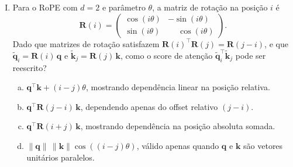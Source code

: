 \documentclass{dlproblemset}
\begin{document}
\begin{enumerate}[I)]
\begin{enumerate}[a)]
    \item São algebraicamente equivalentes: rotacionar os vetores de query e key com
          RoPE produz exatamente o mesmo logit de atenção que somar o PE senoidal ao
          embedding de entrada.
    \item São equivalentes quando $\mathbf{W}_Q = \mathbf{W}_K = \mathbf{I}$ (projeções identidade),
          pois nesse caso adição e rotação têm o mesmo efeito sobre o produto interno.
    \item O PE senoidal é um caso especial do RoPE aplicado somente às duas
          primeiras dimensões do embedding de entrada.
    \item Compartilham o mesmo espectro, mas o PE senoidal soma posição
          \emph{absoluta} antes das projeções e o RoPE aplica rotação
          \emph{relativa} depois delas; nenhuma configuração não trivial de
          pesos os torna equivalentes.
\end{enumerate}

\item {} Para o RoPE com $d = 2$ e parâmetro $\theta$,
      a matriz de rotação na posição $i$ é
      \[
        \mathbf{R}(i) =
        \begin{pmatrix}
          \cos(i\theta) & -\sin(i\theta) \\
          \sin(i\theta) & \phantom{-}\cos(i\theta)
        \end{pmatrix}.
      \]
      Dado que matrizes de rotação satisfazem $\mathbf{R}(i)^\top \mathbf{R}(j) = \mathbf{R}(j - i)$,
      e que $\tilde{\mathbf{q}}_i = \mathbf{R}(i)\,\mathbf{q}$ e
      $\tilde{\mathbf{k}}_j = \mathbf{R}(j)\,\mathbf{k}$, como o score de atenção
      $\tilde{\mathbf{q}}_i^\top \tilde{\mathbf{k}}_j$ pode ser reescrito?

\begin{enumerate}[a)]
    \item $\mathbf{q}^\top\mathbf{k} + (i-j)\theta$,
          mostrando dependência linear na posição relativa.
    \item $\mathbf{q}^\top \mathbf{R}(j-i)\,\mathbf{k}$, dependendo apenas do offset
          relativo $(j-i)$.
    \item $\mathbf{q}^\top \mathbf{R}(i+j)\,\mathbf{k}$,
          mostrando dependência na posição absoluta somada.
    \item $\|\mathbf{q}\|\,\|\mathbf{k}\|\cos((i-j)\theta)$, válido apenas quando
          $\mathbf{q}$ e $\mathbf{k}$ são vetores unitários paralelos.
\end{enumerate}


\end{enumerate}
\end{document}
